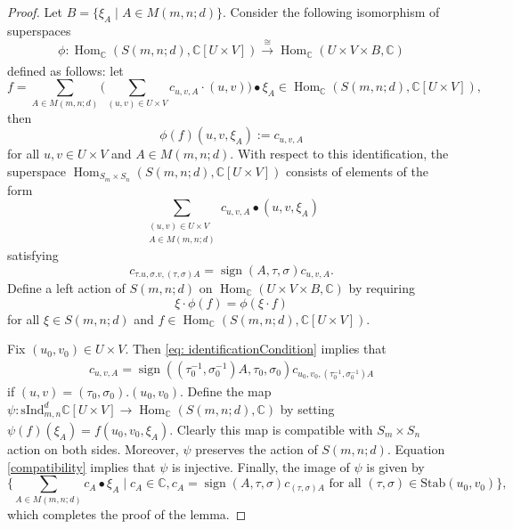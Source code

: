 \documentclass[12pt,reqno]{amsart}
\theoremstyle{definition}
\theoremstyle{remark}
\newcommand{\ind}{\mathrm{sInd}_{m,n}^{d}}
\DeclareMathOperator{\Hom}{Hom}
\DeclareMathOperator{\sign}{sign}
\begin{document}
\begin{proof}
    Let $B=\{\xi_{A}\mid A\in M(m,n;d)\}$. Consider the following isomorphism of superspaces $$\phi:\Hom_{\mathbb{C}}(S(m,n;d),\mathbb{C}[U\times V])\xrightarrow[]{\cong} \Hom_{\mathbb{C}}(U\times V\times B,\mathbb{C})$$
    defined as follows: let
    $$f=\sum_{A\in M(m,n;d)}\big(\sum_{(u,v)\in U\times V}c_{u,v,A}\cdot(u,v)\big)\bullet \xi_{A}\in\Hom_{\mathbb{C}}(S(m,n;d),\mathbb{C}[U\times V]),$$ then
    $$\phi(f)(u,v,\xi_{A}):=c_{u,v,A}$$ for all $u,v\in U\times V$ and $A\in M(m,n;d)$.
    With respect to this identification, the superspace $\Hom_{S_{m}\times S_{n}}(S(m,n;d),\mathbb{C}[U\times V])$ consists of elements of the form $$\sum_{\substack{(u,v)\in U\times V\\A\in M(m,n;d)}} c_{u,v,A}\bullet(u,v,\xi_{A})$$ satisfying
    \begin{equation}\label{eq: identificationCondition}
        c_{\tau.u,\sigma.v,{(\tau,\sigma)A}}=\sign(A,\tau,\sigma)c_{u,v,{A}}.
    \end{equation}
    Define a left action of $S(m,n;d)$ on $\Hom_{\mathbb{C}}(U\times V\times B,\mathbb{C})$ by requiring
    $$\xi\cdot\phi(f)=\phi(\xi\cdot f)$$ for all $\xi\in S(m,n;d)$ and $f\in \Hom_{\mathbb{C}}(S(m,n;d),\mathbb{C}[U\times V])$. 
    
    Fix $(u_{0},v_{0})\in U\times V$. Then \eqref{eq: identificationCondition} implies that
    \begin{align}\label{compatibility}
c_{u,v,{A}}=\sign((\tau_{0}^{-1},\sigma_{0}^{-1})A,\tau_{0},\sigma_{0})c_{u_{0},v_{0},{(\tau_{0}^{-1},\sigma_{0}^{-1})A}}
    \end{align} if $(u,v)=(\tau_{0},\sigma_{0}).(u_{0},v_{0})$. Define the map $\psi:\ind \mathbb{C}[U\times V]\xrightarrow[]{}\Hom_{\mathbb{C}}(S(m,n;d),\mathbb{C})$ by setting $\psi(f)(\xi_{A})=f(u_{0},v_{0},\xi_{A})$. Clearly this map is compatible with $S_{m}\times S_{n}$ action on both sides. Moreover, $\psi$ preserves the action of $S(m,n;d)$. Equation \eqref{compatibility} implies that $\psi$ is injective. Finally, the image of $\psi$ is given by $$\Big\{\sum_{A\in M(m,n;d)}c_{A}\bullet\xi_{A} \;\Big| \; c_{A}\in \mathbb{C}, c_{A}=\sign(A,\tau,\sigma)c_{(\tau,\sigma)A}\text{ for all }(\tau,\sigma)\in \text{Stab}(u_{0},v_{0})\Big\},$$
     which completes the proof of the lemma.
\end{proof}
\end{document}

